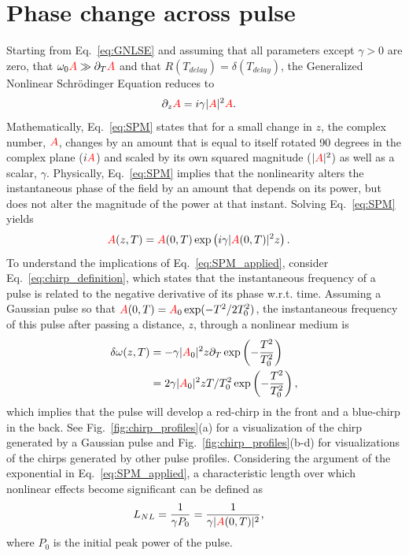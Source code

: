 \section{Phase change across pulse}
Starting from Eq.~\ref{eq:GNLSE} and assuming that all parameters except $\gamma>0$ are zero, that $\omega_0\textcolor{red}{A}\gg\partial_T\textcolor{red}{A}$ and that $R(T_{delay})=\delta(T_{delay})$, the Generalized Nonlinear Schr{\"o}dinger Equation reduces to
\begin{align}
\label{eq:SPM}
    \partial_z\textcolor{red}{A} &= i\gamma|\textcolor{red}{A}|^2\textcolor{red}{A}.
\end{align}
Mathematically, Eq.~\ref{eq:SPM} states that for a small change in $z$, the complex number, $\textcolor{red}{A}$, changes by an amount that is equal to itself rotated 90 degrees in the complex plane ($i\textcolor{red}{A}$) and scaled by its own squared magnitude ($|\textcolor{red}{A}|^2$) as well as a scalar, $\gamma$. Physically, Eq.~\ref{eq:SPM} implies that the nonlinearity alters the instantaneous phase of the field by an amount that depends on its power, but does not alter the magnitude of the power at that instant. Solving Eq.~\ref{eq:SPM} yields
\begin{align}
    \label{eq:SPM_applied}
    \textcolor{red}{A}(z,T)&= \textcolor{red}{A}(0,T)\exp\left( i\gamma|\textcolor{red}{A}(0,T)|^2z \right).
\end{align}
To understand the implications of Eq.~\ref{eq:SPM_applied}, consider Eq.~\ref{eq:chirp_definition}, which states that the instantaneous frequency of a pulse is related to the negative derivative of its phase w.r.t. time.  Assuming a Gaussian pulse so that $\textcolor{red}{A}(0,T)=\textcolor{red}{A}_0\exp(-T^2/2T_0^2)$, the instantaneous frequency of this pulse after passing a distance, $z$, through a nonlinear medium is
\begin{align}
\label{eq:SPM_example}
    \delta\omega(z,T) &= -\gamma |\textcolor{red}{A}_0|^2 z\partial_T \exp\left(-\frac{T^2}{T_0^2}\right)\\ \nonumber
    &= 2\gamma |\textcolor{red}{A}_0|^2 z T/T_0^2 \exp\left(-\frac{T^2}{T_0^2}\right),
\end{align}
which implies that the pulse will develop a red-chirp in the front and a blue-chirp in the back. See Fig.~\ref{fig:chirp_profiles}(a) for a visualization of the chirp generated by a Gaussian pulse and Fig.~\ref{fig:chirp_profiles}(b-d) for visualizations of the chirps generated by other pulse profiles. Considering the argument of the exponential in Eq.~\ref{eq:SPM_applied}, a characteristic length over which nonlinear effects become significant can be defined as
\begin{align}
    L_{NL} &= \frac{1}{\gamma P_0} = \frac{1}{\gamma |\textcolor{red}{A}(0,T)|^2},  
\end{align}
where $P_0$ is the initial peak power of the pulse. 

